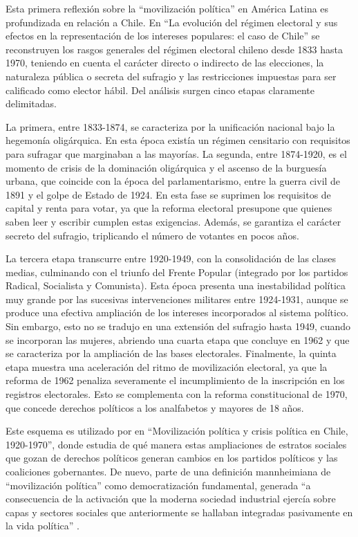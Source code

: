 Esta primera reflexión sobre la \enquote{movilización política} en América Latina es profundizada en relación a Chile. En \enquote{La evolución del régimen electoral y sus efectos en la representación de los intereses populares: el caso de Chile} \parencite{1570-BORON1971} se reconstruyen los rasgos generales del régimen electoral chileno desde 1833 hasta 1970, teniendo en cuenta el carácter directo o indirecto de las elecciones, la naturaleza pública o secreta del sufragio y las restricciones impuestas para ser calificado como elector hábil. Del análisis surgen cinco etapas claramente delimitadas.

La primera, entre 1833-1874, se caracteriza por la unificación nacional bajo la hegemonía oligárquica. En esta época existía un régimen censitario con requisitos para sufragar que marginaban a las mayorías. La segunda, entre 1874-1920, es el momento de crisis de la dominación oligárquica y el ascenso de la burguesía urbana, que coincide con la época del parlamentarismo, entre la guerra civil de 1891 y el golpe de Estado de 1924. En esta fase se suprimen los requisitos de capital y renta para votar, ya que la reforma electoral presupone que quienes saben leer y escribir cumplen estas exigencias. Además, se garantiza el carácter secreto del sufragio, triplicando el número de votantes en pocos años.

La tercera etapa transcurre entre 1920-1949, con la consolidación de las clases medias, culminando con el triunfo del Frente Popular (integrado por los partidos Radical, Socialista y Comunista). Esta época presenta una inestabilidad política muy grande por las sucesivas intervenciones militares entre 1924-1931, aunque se produce una efectiva ampliación de los intereses incorporados al sistema político. Sin embargo, esto no se tradujo en una extensión del sufragio hasta 1949, cuando se incorporan las mujeres, abriendo una cuarta etapa que concluye en 1962 y que se caracteriza por la ampliación de las bases electorales. Finalmente, la quinta etapa muestra una aceleración del ritmo de movilización electoral, ya que la reforma de 1962 penaliza severamente el incumplimiento de la inscripción en los registros electorales. Esto se complementa con la reforma constitucional de 1970, que concede derechos políticos a los analfabetos y mayores de 18 años.

Este esquema es utilizado por \textcite{1571-BORON1970} en \enquote{Movilización política y crisis política en Chile, 1920-1970}, donde estudia de qué manera estas ampliaciones de estratos sociales que gozan de derechos políticos generan cambios en los partidos políticos y las coaliciones gobernantes. De nuevo, parte de una definición mannheimiana de \enquote{movilización política} como democratización fundamental, generada \enquote{a consecuencia de la activación que la moderna sociedad industrial ejercía sobre capas y sectores sociales que anteriormente se hallaban integradas pasivamente en la vida política} \parencite[2]{1571-BORON1970}.

